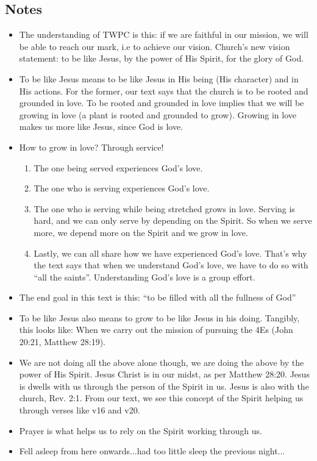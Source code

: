\subsection*{Notes}
\begin{itemize}
  \item{The understanding of TWPC is this: if we are faithful in our mission,
  we will be able to reach our mark, i.e to achieve our vision.  Church’s new
  vision statement: to be like Jesus, by the power of His Spirit, for the
  glory of God.}
  \item{To be like Jesus means to be like Jesus in His being (His character) and in His actions. For the former, our text says that the church is to be rooted and grounded in love. To be rooted and grounded in love implies that we will be growing in love (a plant is rooted and grounded to grow). Growing in love makes us more like Jesus, since God is love.}
  \item{How to grow in love? Through service!
  \begin{enumerate}
    \item{The one being served experiences God’s love.}
    \item{The one who is serving experiences God’s love.}
    \item{The one who is serving while being stretched grows in love.
    Serving is hard, and we can only serve by depending on the Spirit.  So
    when we serve more, we depend more on the Spirit and we grow in love.}
    \item{Lastly, we can all share how we have experienced God’s love.
    That’s why the text says that when we understand God’s love, we have to
    do so with “all the saints”.  Understanding God’s love is a group
    effort.}
  \end{enumerate}}
  \item{The end goal in this text is this: “to be filled with all the fullness of God”}
  \item{To be like Jesus also means to grow to be like Jesus in his doing. Tangibly, this looks like: When we carry out the mission of pursuing the 4Es (John 20:21, Matthew 28:19).}
  \item{We are not doing all the above alone though, we are doing the above by the power of His Spirit. Jesus Christ is in our midst, as per Matthew 28:20. Jesus is dwells with us through the person of the Spirit in us. Jesus is also with the church, Rev. 2:1. From our text, we see this concept of the Spirit helping us through verses like v16 and v20.}
  \item{Prayer is what helps us to rely on the Spirit working through us.}
  \item{Fell asleep from here onwards...had too little sleep the previous night...}
\end{itemize}